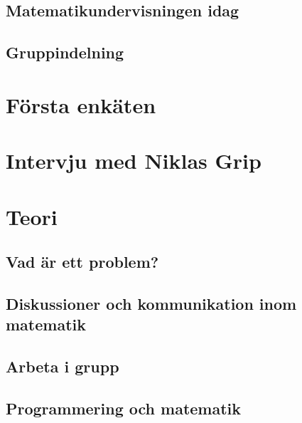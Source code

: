 \documentclass[11 pt,a4paper]{article}
\begin{document}
    \subsection{Matematikundervisningen idag}
        
        
    \subsection{Gruppindelning}
        \label{sec:Gruppindelning}
        
        
\section{Första enkäten}
    

\section{Intervju med Niklas Grip}
    

\section{Teori}
    \label{sec:Teori}
    
    
    \subsection{Vad är ett problem?}
        
        
    \subsection{Diskussioner och kommunikation inom matematik}
        
        
    \subsection{Arbeta i grupp}
        
        
    \subsection{Programmering och matematik}
        \label{sec:ProgrammeringOchMatematik}
        
        
\end{document}
